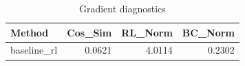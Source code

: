 \begin{table}[htbp]
\centering
\caption{Gradient diagnostics}
\label{tab:grad-diag}
\begin{tabular}{lrrr}
\toprule
\textbf{Method} & \textbf{Cos\_Sim} & \textbf{RL\_Norm} & \textbf{BC\_Norm} \\
\midrule
baseline\_rl & 0.0621 & 4.0114 & 0.2302 \\
\bottomrule
\end{tabular}
\end{table}